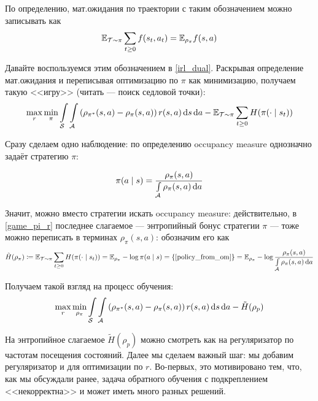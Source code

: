 По определению, мат.ожидания по траектории с таким обозначением можно записывать как
$$\mathbb{E}_{\mathcal{T} \sim \pi} \sum_{t \ge 0} f(s_t, a_t) = \mathbb{E}_{\rho_{\pi}} f(s, a)$$

Давайте воспользуемся этим обозначением в \eqref{irl_dual}. Раскрывая определение мат.ожидания и переписывая оптимизацию по $\pi$ как минимизацию, получаем такую <<игру>> (читать --- поиск седловой точки):
\begin{equation}\label{game_pi_r}
\max\limits_{r} \min\limits_{\pi} \int\limits_{\mathcal{S}} \int\limits_{\mathcal{A}} \left(\rho_{\pi^*}(s, a) - \rho_\pi(s, a)\right) r(s, a) \mathop{}\!\mathrm{d} s \mathop{}\!\mathrm{d} a - \mathbb{E}_{\mathcal{T} \sim \pi} \sum_{t \ge 0} H(\pi(\cdot \mid s_t))
\end{equation}

Сразу сделаем одно наблюдение: по определению occupancy measure однозначно задаёт стратегию $\pi$:

\begin{proposition}
\begin{equation}\label{policy_from_om}
\pi(a \mid s) = \frac{\rho_\pi(s, a)}{\int\limits_{\mathcal{A}} \rho_\pi(s, a) \mathop{}\!\mathrm{d} a}
\end{equation}
\end{proposition}

Значит, можно вместо стратегии искать occupancy measure: действительно, в \eqref{game_pi_r} последнее слагаемое --- энтропийный бонус стратегии $\pi$ --- тоже можно переписать в терминах $\rho_\pi(s, a)$: обозначим его как
$$\tilde{H}(\rho_\pi) \coloneqq \mathbb{E}_{\mathcal{T} \sim \pi} \sum_{t \ge 0} H(\pi(\cdot \mid s_t)) = \mathbb{E}_{\rho_\pi} -\log \pi(a \mid s) = \{ \text{\eqref{policy_from_om}} \} = \mathbb{E}_{\rho_\pi} -\log \frac{\rho_\pi(s, a)}{\int\limits_{\mathcal{A}} \rho_\pi(s, a) \mathop{}\!\mathrm{d} a}$$

Получаем такой взгляд на процесс обучения:
\begin{equation}\label{game_pi_rho}
\max\limits_{r} \min\limits_{\rho_\pi} \int\limits_{\mathcal{S}} \int\limits_{\mathcal{A}} \left(\rho_{\pi^*}(s, a) - \rho_\pi(s, a)\right) r(s, a) \mathop{}\!\mathrm{d} s \mathop{}\!\mathrm{d} a - \tilde{H}(\rho_p)
\end{equation}

На энтропийное слагаемое $\tilde{H}(\rho_p)$ можно смотреть как на регуляризатор по частотам посещения состояний. Далее мы сделаем важный шаг: мы добавим регуляризатор и для оптимизации по $r$. Во-первых, это мотивировано тем, что, как мы обсуждали ранее, задача обратного обучения с подкреплением <<некорректна>> и может иметь много разных решений. 


